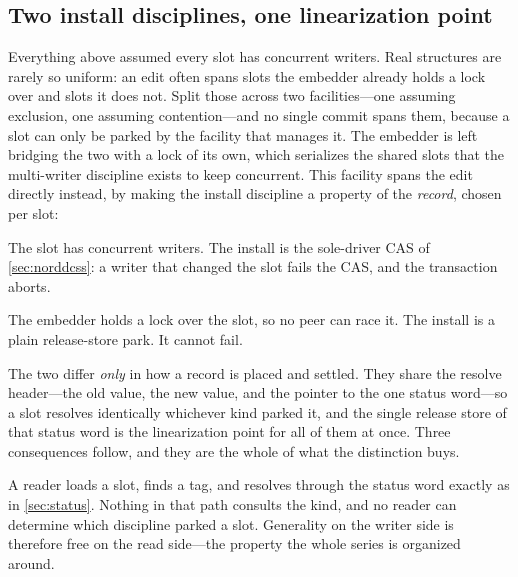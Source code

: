 \documentclass[11pt]{article}
\begin{document}
\subsection{Two install disciplines, one linearization point}
\label{sec:kinds}



Everything above assumed every slot has concurrent writers. Real structures are
rarely so uniform: an edit often spans slots the embedder already holds a lock
over and slots it does not. Split those across two facilities---one assuming
exclusion, one assuming contention---and no single commit spans them, because a
slot can only be parked by the facility that manages it. The embedder is left
bridging the two with a lock of its own, which serializes the shared slots that
the multi-writer discipline exists to keep concurrent. This facility spans the
edit directly instead, by making the install discipline a property of the
\emph{record}, chosen per slot:

\begin{description}\setlength{\itemsep}{2pt}
\item[Shared (\mw).] The slot has concurrent writers. The install is the
      sole-driver CAS of \cref{sec:norddcss}: a writer that changed the slot
      fails the CAS, and the transaction aborts.
\item[Exclusive (\sw).] The embedder holds a lock over the slot, so no peer can
      race it. The install is a plain release-store park. It cannot fail.
\end{description}

The two differ \emph{only} in how a record is placed and settled. They share the
resolve header---the old value, the new value, and the pointer to the one status
word---so a slot resolves identically whichever kind parked it, and the single
release store of that status word is the linearization point for all of them at
once. Three consequences follow, and they are the whole of what the distinction
buys.

\begin{property}
\label{prop:kindinvisible}
A reader loads a slot, finds a tag, and resolves through the status word exactly
as in \cref{sec:status}. Nothing in that path consults the kind, and no reader
can determine which discipline parked a slot. Generality on the writer side is
therefore free on the read side---the property the whole series is organized
around.
\end{property}
\end{document}
